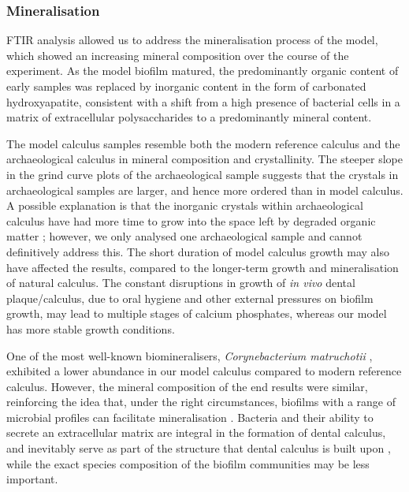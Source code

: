 \documentclass[10pt,a4paper]{article}
\begin{document}
\subsubsection{Mineralisation}\label{mineralisation}

FTIR analysis allowed us to address the mineralisation process of the
model, which showed an increasing mineral composition over the course of
the experiment. As the model biofilm matured, the predominantly organic
content of early samples was replaced by inorganic content in the form
of carbonated hydroxyapatite, consistent with a shift from a high
presence of bacterial cells in a matrix of extracellular polysaccharides
\citep{jainIsolationCharacterization2013, sutherlandBiofilmMatrix2001, zhangMeasurementPolysaccharides1998}
to a predominantly mineral content.

The model calculus samples resemble both the modern reference calculus
and the archaeological calculus in mineral composition and
crystallinity. The steeper slope in the grind curve plots of the
archaeological sample suggests that the crystals in archaeological
samples are larger, and hence more ordered than in model calculus. A
possible explanation is that the inorganic crystals within
archaeological calculus have had more time to grow into the space left
by degraded organic matter \citep{weinerBiologicalMaterials2010};
however, we only analysed one archaeological sample and cannot
definitively address this. The short duration of model calculus growth
may also have affected the results, compared to the longer-term growth
and mineralisation of natural calculus. The constant disruptions in
growth of \emph{in vivo} dental plaque/calculus, due to oral hygiene and
other external pressures on biofilm growth, may lead to multiple stages
of calcium phosphates, whereas our model has more stable growth
conditions.

One of the most well-known biomineralisers, \emph{Corynebacterium
matruchotii}
\citep{enneverCharacterizationBacterionema1978, takazoeCalciumHydroxyapatite1970},
exhibited a lower abundance in our model calculus compared to modern
reference calculus. However, the mineral composition of the end results
were similar, reinforcing the idea that, under the right circumstances,
biofilms with a range of microbial profiles can facilitate
mineralisation \citep{moorerCalcificationCariogenic1993}. Bacteria and
their ability to secrete an extracellular matrix are integral in the
formation of dental calculus, and inevitably serve as part of the
structure that dental calculus is built upon
\citep{rohanizadehUltrastructuralStudy2005}, while the exact species
composition of the biofilm communities may be less important.
\end{document}
